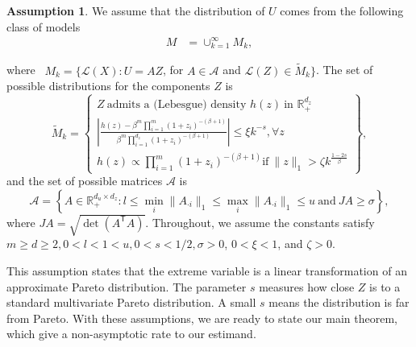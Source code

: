 \documentclass[12pt]{article}
\theoremstyle{plain}
\theoremstyle{definition}
\newtheorem{assumption}[theorem]{Assumption}
\newcommand{\nobracket}{}
\begin{document}
\begin{assumption}
  \label{assump:mvary}We assume that the distribution of $U$ comes from the
  following class of models
  \begin{align*}
    M & = \cup_{k = 1}^{\infty} M_k,
  \end{align*}
  
  where \ $M_k =\{\mathcal{L}(X) : U = AZ$, for $A \in \mathcal{A}$ and
  $\nobracket \mathcal{L}(Z) \in \tilde{M}_k \}$. The set of possible
  distributions for the components $Z$ is
  \[ \tilde{M}_k = \left\{ \begin{array}{c}
       Z \ \text{admits a (Lebesgue) density } h (z)  \  \text{in } \mathbb{R}_+^{d_z} \\
       \left| \frac{h (z) - \beta^m  \prod_{i = 1}^m (1 +
       z_i)^{- (\beta + 1)}}{\beta^m  \prod_{i = 1}^{d_z} (1 + z_i)^{- (\beta +
       1)}} \right| \leqslant \xi k^{- s}, \forall z\\
       h (z) \varpropto \prod_{i = 1}^m (1 + z_i)^{- (\beta + 1)}  \text{if} \ \|z\|_1 > \zeta k^{\frac{1 - 2 s}{\beta}}
     \end{array} \right\}, \]
  and the set of possible matrices $\mathcal{A}$ is
  \[ \mathcal{A}= \left\{ A \in \mathbb{R}_+^{d_u \times d_z} : l \leq \min_i
     \|A_{\cdot i} \|_1 \leq \max_i \|A_{\cdot i} \|_1 \leq u \ \text{and} \  JA
     \geq \sigma \right\} ,\]
  where ${J}A = \sqrt{\det(A^\mathsf{T}A)}$. Throughout, we assume the constants satisfy $m \geq d \geq 2, 0 < l < 1 < u,
  0 < s < 1 / 2, \sigma > 0$, $0 < \xi < 1$, and $\zeta > 0$.
\end{assumption}

This assumption states that the extreme variable is a linear transformation of an approximate Pareto distribution. The parameter $s$ measures how close $Z$ is to a standard multivariate Pareto distribution. A small $s$ means the distribution is far from Pareto. With these assumptions, we are ready to state our main theorem, which give a
non-asymptotic rate to our estimand.
\end{document}
